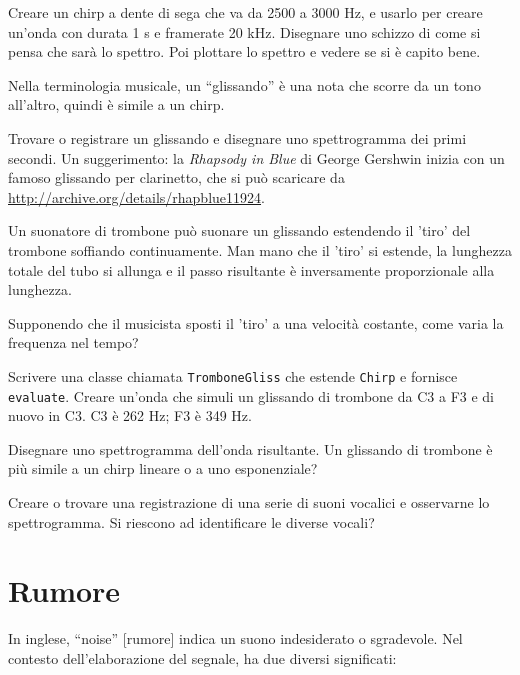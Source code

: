 \documentclass[12pt]{book} \usepackage[width=5.5in,height=8.5in, hmarginratio=3:2,vmarginratio=1:1]{geometry}
\begin{document}
\begin{exercise} Creare un chirp a dente di sega che va da 2500 a 3000 Hz, e usarlo per creare un'onda con durata 1 s e framerate 20 kHz. Disegnare uno schizzo di come si pensa che sarà lo spettro. Poi plottare lo spettro e vedere se si è capito bene. \end{exercise} 

\begin{exercise} Nella terminologia musicale, un ``glissando'' è una nota che scorre da un tono all'altro, quindi è simile a un chirp.

Trovare o registrare un glissando e disegnare uno spettrogramma dei primi secondi. Un suggerimento: la {\it Rhapsody in Blue} di George Gershwin inizia con un famoso glissando per clarinetto, che si può scaricare da \url{http://archive.org/details/rhapblue11924}. \end{exercise} 

\begin{exercise} Un suonatore di trombone può suonare un glissando estendendo il 'tiro' del trombone soffiando continuamente. Man mano che il 'tiro' si estende, la lunghezza totale del tubo si allunga e il passo risultante è inversamente proporzionale alla lunghezza.

Supponendo che il musicista sposti il 'tiro' a una velocità costante, come varia la frequenza nel tempo?

Scrivere una classe chiamata {\tt TromboneGliss} che estende {\tt Chirp} e fornisce {\tt evaluate}. Creare un'onda che simuli un glissando di trombone da C3 a F3 e di nuovo in C3. C3 è 262 Hz; F3 è 349 Hz.

Disegnare uno spettrogramma dell'onda risultante. Un glissando di trombone è più simile a un chirp lineare o a uno esponenziale? \end{exercise} 

\begin{exercise} Creare o trovare una registrazione di una serie di suoni vocalici e osservarne lo spettrogramma. Si riescono ad identificare le diverse vocali? \end{exercise} 

\chapter{Rumore} 

In inglese, ``noise'' [rumore] indica un suono indesiderato o sgradevole. Nel contesto dell'elaborazione del segnale, ha due diversi significati:
\end{document}
